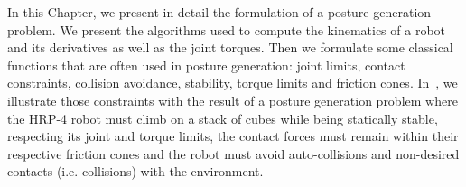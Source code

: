 

In this Chapter, we present in detail the formulation of a posture generation problem.
We present the algorithms used to compute the kinematics of a robot and its derivatives as well as the joint torques.
Then we formulate some classical functions that are often used in posture generation: joint limits, contact constraints, collision avoidance, stability, torque limits and friction cones.
In~, we illustrate those constraints with the result of a posture generation problem where the HRP-4 robot must climb on a stack of cubes while being statically stable, respecting its joint and torque limits, the contact forces must remain within their respective friction cones and the robot must avoid auto-collisions and non-desired contacts (i.e. collisions) with the environment.


